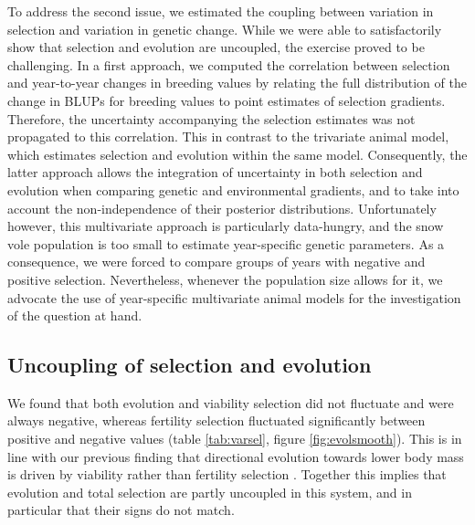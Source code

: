 To address the second issue, we estimated the coupling between variation in selection and variation in genetic change. While we were able to satisfactorily show that selection and evolution are uncoupled, the exercise proved to be challenging. In a first approach, we computed the correlation between selection and year-to-year changes in breeding values by relating the full distribution of the change in BLUPs for breeding values to point estimates of selection gradients. Therefore, the uncertainty accompanying the selection estimates was not propagated to this correlation. This in contrast to the trivariate animal model, which estimates selection and evolution within the same model. Consequently, the latter approach allows the integration of uncertainty in both selection and evolution when comparing genetic and environmental gradients, and to take into account the non-independence of their posterior distributions. Unfortunately however, this multivariate approach is particularly data-hungry, and the snow vole population is too small to estimate year-specific genetic parameters. As a consequence, we were forced to compare groups of years with negative and positive selection. Nevertheless, whenever the population size allows for it, we advocate the use of year-specific multivariate animal models for the investigation of the question at hand.

\subsection*{Uncoupling of selection and evolution}
We found that both evolution and viability selection did not fluctuate and were always negative, whereas fertility selection fluctuated significantly between positive and negative values (table \ref{tab:varsel}, figure \ref{fig:evolsmooth}). 
This is in line with our previous finding that directional evolution towards lower body mass is driven by viability rather than fertility selection \parencite{Bonnet2016}. Together this implies that evolution and total selection are partly uncoupled in this system, and in particular that their signs do not match. 

